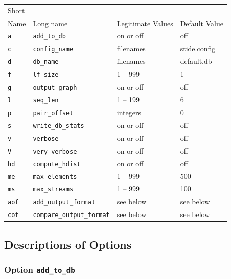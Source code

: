 \documentclass{amsart}
\begin{document}
\vspace{.2in}
\setlength{\extrarowheight}{3pt}

\begin{tabular}{l|l|l|l}

\vspace{-3pt}
Short &&& \\
Name & Long name & Legitimate Values & Default Value \\ 
\hline 

{\tt a}   & {\tt add\_to\_db}       & on or off         & off \\ 
{\tt c}   & {\tt config\_name}      & filenames         & stide.config \\ 
{\tt d}   & {\tt db\_name}          & filenames         & default.db \\ 
{\tt f}   & {\tt lf\_size}          & 1 -- 999          & 1     \\ 
{\tt g}   & {\tt output\_graph}     & on or off         & off   \\ 
{\tt l}   & {\tt seq\_len}          & 1 -- 199          & 6     \\ 
{\tt p}   & {\tt pair\_offset}      & integers          & 0     \\ 
{\tt s}   & {\tt write\_db\_stats}  & on or off         & off   \\ 
{\tt v}   & {\tt verbose}           & on or off         & off   \\ 
{\tt V}   & {\tt very\_verbose}     & on or off         & off   \\ 
{\tt hd}  & {\tt compute\_hdist}    & on or off         & off   \\ 
{\tt me}  & {\tt max\_elements}     & 1 -- 999          & 500   \\ 
{\tt ms}  & {\tt max\_streams}      & 1 -- 999          & 100   \\ 
{\tt aof} & {\tt add\_output\_format} & see below       & see below \\ 
{\tt cof} & {\tt compare\_output\_format} & see below   & see below \\ 

\end{tabular}

\vspace{.2in}

\subsection{Descriptions of Options}

\subsubsection{Option {\tt add\_to\_db} }
 
\end{document}
